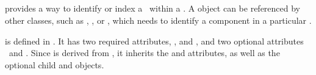 \subsection{}
\label{def:SpeciesTypeComponentIndex}

 provides a way to identify or index a \component\ within a \speciesType. A  object can be referenced by other \mBlockChangedBegin{\revTwentyTwentyMarch} classes\mBlockChangedEnd{\revTwentyTwentyMarch}, such as \InSpeciesTypeBond, \OutwardBindingSite, \SpeciesFeature or \SpeciesTypeComponentMapInProduct, which needs to identify a component in a particular \speciesType. 

 is defined in . It has two required attributes, \idAtt, and \componentAtt, and two optional attributes \nameAtt\ and \identifyingParentAtt.  Since  is derived from , it inherits the  and  attributes, as well as the optional \mBlockChangedBegin{\revTwentyTwentyMarch}child\mBlockChangedEnd{\revTwentyTwentyMarch}  and  objects. 

